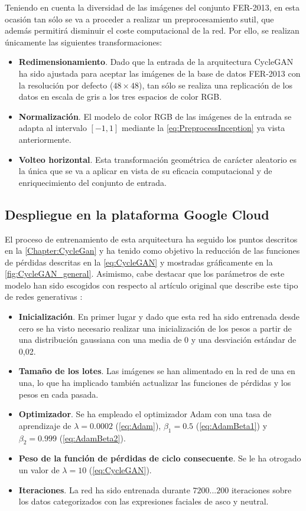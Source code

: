 Teniendo en cuenta la diversidad de las imágenes del conjunto FER-2013, en esta ocasión tan sólo se va a proceder a realizar un preprocesamiento sutil, que además permitirá disminuir el coste computacional de la red. Por ello, se realizan únicamente las siguientes transformaciones:
\begin{itemize}
    \item \textbf{Redimensionamiento}. Dado que la entrada de la arquitectura CycleGAN ha sido ajustada para aceptar las imágenes de la base de datos FER-2013 con la resolución por defecto ($48 \times 48$), tan sólo se realiza una replicación de los datos en escala de gris a los tres espacios de color RGB.
    \item \textbf{Normalización}. El modelo de color RGB de las imágenes de la entrada se adapta al intervalo $[-1, 1]$ mediante la \autoref{eq:PreprocessInception} ya vista anteriormente.
    \item \textbf{Volteo horizontal}. Esta transformación geométrica de carácter aleatorio es la única que se va a aplicar en vista de su eficacia computacional y de enriquecimiento del conjunto de entrada.
\end{itemize}

\subsection{Despliegue en la plataforma Google Cloud}

El proceso de entrenamiento de esta arquitectura ha seguido los puntos descritos en la \autoref{Chapter:CycleGan} y ha tenido como objetivo la reducción de las funciones de pérdidas descritas en la \autoref{eq:CycleGAN} y mostradas gráficamente en la \autoref{fig:CycleGAN_general}. Asimismo, cabe destacar que los parámetros de este modelo han sido escogidos con respecto al artículo original que describe este tipo de redes generativas \cite{cycleGAN}:
\begin{itemize}
    \item \textbf{Inicialización}. En primer lugar y dado que esta red ha sido entrenada desde cero se ha visto necesario realizar una inicialización de los pesos a partir de una distribución gaussiana con una media de 0 y una desviación estándar de 0,02. 
    \item \textbf{Tamaño de los lotes}. Las imágenes se han alimentado en la red de una en una, lo que ha implicado también actualizar las funciones de pérdidas y los pesos en cada pasada.
    \item \textbf{Optimizador}. Se ha empleado el optimizador Adam con una tasa de aprendizaje de $ \lambda = 0.0002$ (\autoref{eq:Adam}), $\beta_1 = 0.5$ (\autoref{eq:AdamBeta1}) y $\beta_2 = 0.999$ (\autoref{eq:AdamBeta2}).
    \item \textbf{Peso de la función de pérdidas de ciclo consecuente}. Se le ha otrogado un valor de $\lambda = 10$ (\autoref{eq:CycleGAN}).
    \item \textbf{Iteraciones}. La red ha sido entrenada durante $7200...200$ iteraciones sobre los datos categorizados con las expresiones faciales de asco y neutral.
\end{itemize}


